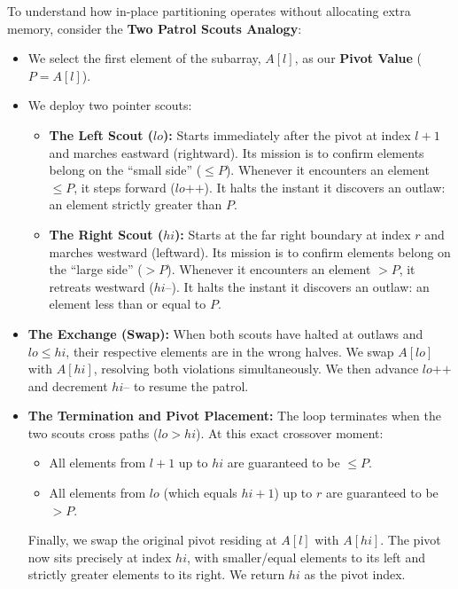 \documentclass[10pt,journal,compsoc,onecolumn]{IEEEtran}
\begin{document}
To understand how in-place partitioning operates without allocating extra memory, consider the \textbf{Two Patrol Scouts Analogy}:
\begin{itemize}
    \item We select the first element of the subarray, $A[l]$, as our \textbf{Pivot Value} ($P = A[l]$).
    \item We deploy two pointer scouts:
    \begin{itemize}
        \item \textbf{The Left Scout ($lo$):} Starts immediately after the pivot at index $l + 1$ and marches eastward (rightward). Its mission is to confirm elements belong on the ``small side'' ($\le P$). Whenever it encounters an element $\le P$, it steps forward ($lo\text{++}$). It halts the instant it discovers an outlaw: an element strictly greater than $P$.
        \item \textbf{The Right Scout ($hi$):} Starts at the far right boundary at index $r$ and marches westward (leftward). Its mission is to confirm elements belong on the ``large side'' ($> P$). Whenever it encounters an element $> P$, it retreats westward ($hi\text{--}$). It halts the instant it discovers an outlaw: an element less than or equal to $P$.
    \end{itemize}
    \item \textbf{The Exchange (Swap):} When both scouts have halted at outlaws and $lo \le hi$, their respective elements are in the wrong halves. We swap $A[lo]$ with $A[hi]$, resolving both violations simultaneously. We then advance $lo\text{++}$ and decrement $hi\text{--}$ to resume the patrol.
    \item \textbf{The Termination and Pivot Placement:} The loop terminates when the two scouts cross paths ($lo > hi$). At this exact crossover moment:
    \begin{itemize}
        \item All elements from $l + 1$ up to $hi$ are guaranteed to be $\le P$.
        \item All elements from $lo$ (which equals $hi + 1$) up to $r$ are guaranteed to be $> P$.
    \end{itemize}
    Finally, we swap the original pivot residing at $A[l]$ with $A[hi]$. The pivot now sits precisely at index $hi$, with smaller/equal elements to its left and strictly greater elements to its right. We return $hi$ as the pivot index.
\end{itemize}
\end{document}
